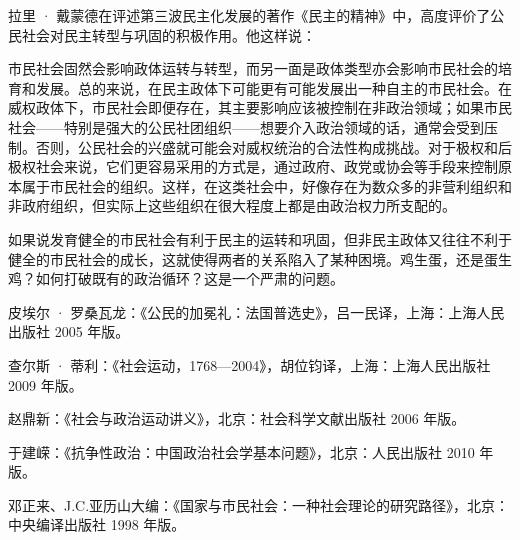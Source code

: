 拉里 · 戴蒙德在评述第三波民主化发展的著作《民主的精神》中，高度评价了公民社会对民主转型与巩固的积极作用。他这样说：


市民社会固然会影响政体运转与转型，而另一面是政体类型亦会影响市民社会的培育和发展。总的来说，在民主政体下可能更有可能发展出一种自主的市民社会。在威权政体下，市民社会即便存在，其主要影响应该被控制在非政治领域；如果市民社会——特别是强大的公民社团组织——想要介入政治领域的话，通常会受到压制。否则，公民社会的兴盛就可能会对威权统治的合法性构成挑战。对于极权和后极权社会来说，它们更容易采用的方式是，通过政府、政党或协会等手段来控制原本属于市民社会的组织。这样，在这类社会中，好像存在为数众多的非营利组织和非政府组织，但实际上这些组织在很大程度上都是由政治权力所支配的。

如果说发育健全的市民社会有利于民主的运转和巩固，但非民主政体又往往不利于健全的市民社会的成长，这就使得两者的关系陷入了某种困境。鸡生蛋，还是蛋生鸡？如何打破既有的政治循环？这是一个严肃的问题。


皮埃尔 · 罗桑瓦龙：《公民的加冕礼：法国普选史》，吕一民译，上海：上海人民出版社 2005 年版。

查尔斯 · 蒂利：《社会运动，1768—2004》，胡位钧译，上海：上海人民出版社 2009 年版。

赵鼎新：《社会与政治运动讲义》，北京：社会科学文献出版社 2006 年版。

于建嵘：《抗争性政治：中国政治社会学基本问题》，北京：人民出版社 2010 年版。

邓正来、J.C.亚历山大编：《国家与市民社会：一种社会理论的研究路径》，北京：中央编译出版社 1998 年版。
